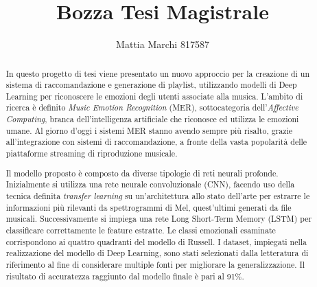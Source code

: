 \documentclass[11pt]{report}
\makeatletter
\newcommand\frontmatter{%
    \cleardoublepage
  \pagenumbering{Roman}}
\makeatother
\begin{document}
\frontmatter

\title{Bozza Tesi Magistrale}

\author{Mattia Marchi 817587 }

\date{}

\maketitle



\newpage

\begin{abstract}
In questo progetto di tesi viene presentato un nuovo approccio per la creazione di un sistema di raccomandazione e generazione di playlist, utilizzando modelli di Deep Learning per riconoscere le emozioni degli utenti associate alla musica. L'ambito di ricerca è definito\textit{ Music Emotion Recognition }(MER), sottocategoria dell’\textit{Affective Computing}, branca dell’intelligenza artificiale che riconosce ed utilizza le emozioni umane. Al giorno d'oggi i sistemi MER stanno avendo sempre più risalto, grazie all'integrazione con sistemi di raccomandazione, a fronte della vasta popolarità delle piattaforme streaming di riproduzione musicale. 

Il modello proposto è composto da diverse tipologie di reti neurali profonde. Inizialmente si utilizza una rete neurale convoluzionale (CNN), facendo uso della tecnica definita \textit{transfer learning} su un’architettura allo stato dell'arte per estrarre le informazioni più rilevanti da spettrogrammi di Mel, quest’ultimi generati da file musicali. Successivamente si impiega una rete Long Short-Term Memory (LSTM) per classificare correttamente le feature estratte. Le classi emozionali esaminate corrispondono ai quattro quadranti del modello di Russell. I dataset, impiegati nella realizzazione del modello di Deep Learning, sono stati selezionati dalla letteratura di riferimento al fine di considerare multiple fonti per migliorare la generalizzazione. Il risultato di accuratezza raggiunto dal modello finale è pari al 91\%. 



\end{abstract}
\end{document}
